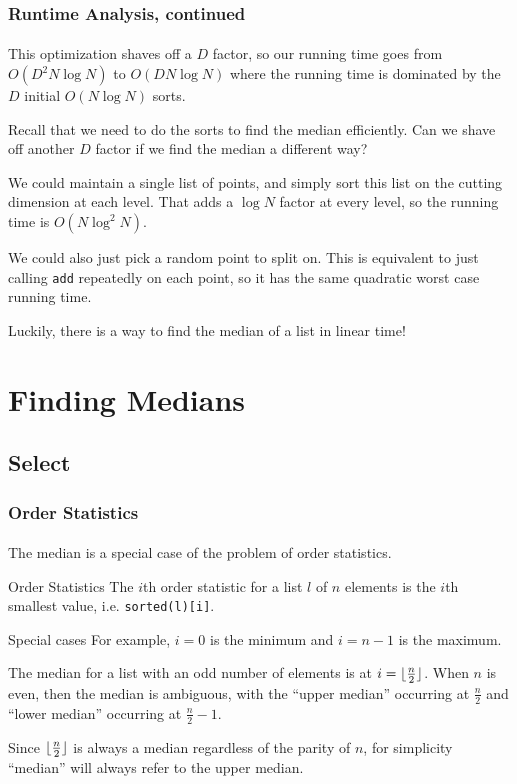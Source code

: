 \documentclass{beamer}                             %
\DeclarePairedDelimiter\floor{\lfloor}{\rfloor}
\begin{document}
\begin{frame}
\frametitle{Runtime Analysis, continued}
\framesubtitle{}
This optimization shaves off a \( D \) factor, so our running time goes from
\( O(D^2 N \log N) \) to \( O(D N \log N) \) where the running time
is dominated by the \( D \) initial \( O(N \log N) \) sorts. \pause

Recall that we need to do the sorts to find the median efficiently. Can we
shave off another \( D \) factor if we find the median a different way? \pause

We could maintain a single list of points, and simply sort this list on the
cutting dimension at each level. That adds a \( \log N \) factor at every level,
so the running time is \( O(N \log^2 N) \). \pause

We could also just pick a random point to split on. This is equivalent to just
calling \texttt{add} repeatedly on each point, so it has the same quadratic
worst case running time. \pause

Luckily, there is a way to find the median of a list in linear time!
\end{frame}

\section{Finding Medians}
\subsection{Select}

\begin{frame}
\frametitle{Order Statistics}
\framesubtitle{}
The median is a special case of the problem of \alert{order statistics}.

\begin{block}{Order Statistics}
  The \( i \)th order statistic for a list \( l \) of \( n \) elements
  is the \( i \)th smallest value, i.e. \texttt{sorted(l)[i]}.
\end{block} \pause

\begin{exampleblock}{Special cases}
  For example, \( i = 0 \) is the minimum and \( i = n - 1 \) is the maximum.
\end{exampleblock} \pause

The median for a list with an odd number of elements is at
\( i = \floor{\frac{n}{2}} \). When \( n \) is even, then the median is
ambiguous, with the \enquote{upper median} occurring at \( \frac{n}{2} \)
and \enquote{lower median} occurring at \( \frac{n}{2} - 1 \). \pause

Since \( \floor{\frac{n}{2}} \) is always a median regardless of the parity of
\( n \), for simplicity \enquote{median} will always refer to the upper median.
\end{frame}
\end{document}

